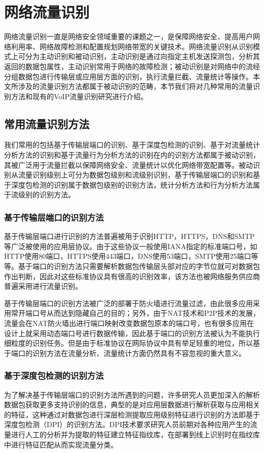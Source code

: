 \section{网络流量识别}
网络流量识别一直是网络安全领域重要的课题之一，是保障网络安全、提高用户网络利用率、网络故障检测和配置规划网络带宽的关键技术。网络流量识别从识别模式上可分为主动识别和被动识别，主动识别是通过向指定主机发送探测包，分析其返回的数据包属性，主动识别常用于网络的故障检测；被动识别是对网络中的流经分组数据包进行传输层或应用层方面的识别，执行流量拦截、流量统计等操作。本文所涉及的流量识别方法都属于被动识别的范畴，本节我们将对几种常用的流量识别方法和现有的VoIP流量识别研究进行介绍。


\subsection{常用流量识别方法}
我们常用的包括基于传输层端口的识别、基于深度包检测的识别、基于对流量统计分析方法的识别和基于流量行为分析方法的识别在内的识别方法都属于被动识别，其被广泛用于流量拦截以保障网络安全、流量统计以优化网络带宽配置等。被动识别从流量识别级别上可分为数据包级别和流级别识别，基于传输层端口的识别和基于深度包检测的识别属于数据包级别的识别方法，统计分析方法和行为分析方法属于流级别的识别方法。

\subsubsection{基于传输层端口的识别方法}
基于传输层端口进行识别的方法普遍被用于识别HTTP，HTTPS，DNS和SMTP等广泛被使用的应用层协议。由于这些协议一般使用IANA指定的标准端口号，如HTTP使用80端口，HTTPS使用443端口，DNS使用53端口，SMTP使用25端口等等。基于端口的识别方法只需要解析数据包传输层头部对应的字节位就可对数据包作出判断，因此对这些标准协议具有很高的识别效率，该方法也被网络服务供应商普遍采用进行流量识别。

基于传输层端口的识别方法被广泛的部署于防火墙进行流量过滤，由此很多应用采用常开端口号从而达到隐藏自己的目的；另外，由于NAT技术和P2P技术的发展，流量会在NAT防火墙出进行端口映射改变数据包原本的端口号，也有很多应用在设计上就采用动态端口号进行数据传输，因此基于端口的识别方法被认为不能执行细粒度的识别任务\supercite{port1,port2}。但是由于标准协议在网际协议中具有举足轻重的地位，所以基于端口的识别方法在流量分析、流量统计方面仍然具有不容忽视的重大意义。

\subsubsection{基于深度包检测的识别方法}
为了解决基于传输层端口的识别方法所遇到的问题，许多研究人员更加深入的解析数据包获取更多支持识别的信息，典型的是对应用层数据进行解析获取与应用相关的特征，这种通过对数据包进行深层检测提取应用级别特征进行识别的方法即基于深度包检测（DPI）的识别方法。DPI技术要求研究人员前期对各种应用产生的流量进行人工的分析并为提取的特征建立特征指纹库，在部署到线上识别时在指纹库中进行特征匹配从而实现流量分类。

